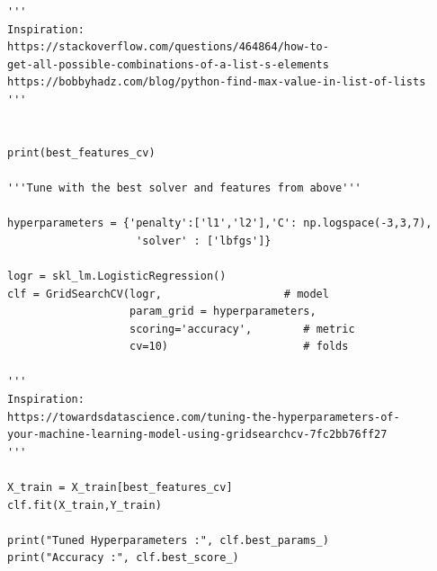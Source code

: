 \documentclass{article}
\begin{document}
\begin{verbatim}
'''
Inspiration:
https://stackoverflow.com/questions/464864/how-to-
get-all-possible-combinations-of-a-list-s-elements
https://bobbyhadz.com/blog/python-find-max-value-in-list-of-lists
'''


print(best_features_cv)

'''Tune with the best solver and features from above'''

hyperparameters = {'penalty':['l1','l2'],'C': np.logspace(-3,3,7),
                    'solver' : ['lbfgs']}

logr = skl_lm.LogisticRegression()
clf = GridSearchCV(logr,                   # model
                   param_grid = hyperparameters,
                   scoring='accuracy',        # metric
                   cv=10)                     # folds

'''
Inspiration: 
https://towardsdatascience.com/tuning-the-hyperparameters-of-
your-machine-learning-model-using-gridsearchcv-7fc2bb76ff27
'''

X_train = X_train[best_features_cv]
clf.fit(X_train,Y_train)

print("Tuned Hyperparameters :", clf.best_params_)
print("Accuracy :", clf.best_score_)


\end{verbatim}
\end{document}
